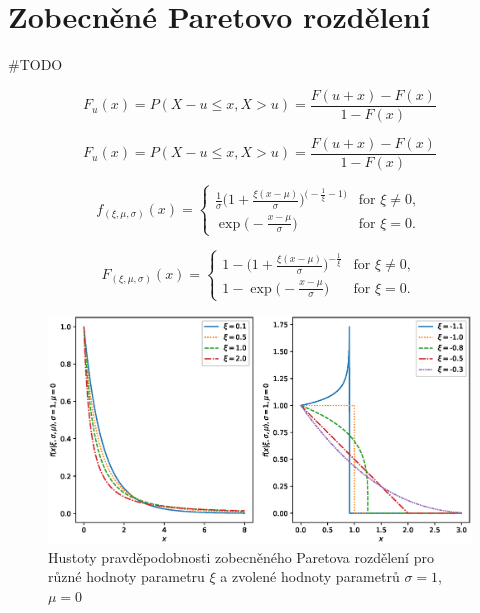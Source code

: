 \chapter{Zobecněné Paretovo rozdělení}\label{chap:gpd}
\#TODO

\begin{equation}
    F_u(x)=P(X-u \leq x,X>u)=\frac{F(u+x)-F(x)}{1-F(x)}
\end{equation}

\begin{equation}
    F_u(x)=P(X-u \leq x,X>u)=\frac{F(u+x)-F(x)}{1-F(x)}
\end{equation}


\begin{equation}
  f_{(\xi,\mu,\sigma)}(x)=\begin{cases}
    \frac{1}{\sigma}\Bigg(1+\frac{\xi(x-\mu)}{\sigma}\Bigg)^{\Big(-\frac{1}{\xi}-1\Big)} & \text{for $\xi \neq 0$},\\
    \exp \Big(-\frac{x-\mu}{\sigma}\Big) & \text{for $\xi = 0$}.
  \end{cases}
\end{equation}


\begin{equation}
  F_{(\xi,\mu,\sigma)}(x)=\begin{cases}
    1 - \Bigg(1+\frac{\xi(x-\mu)}{\sigma}\Bigg)^{-\frac{1}{\xi}} & \text{for $\xi \neq 0$},\\
    1 - \exp{\Big(-\frac{x-\mu}{\sigma} \Big)} & \text{for $\xi = 0$}.
  \end{cases}
\end{equation}

\begin{figure}
    \centering
    \includegraphics[scale=0.68]{IMG/MDPI/pdfs.eps}
    \caption{Hustoty pravděpodobnosti zobecněného Paretova rozdělení pro různé hodnoty parametru $\xi$ a zvolené hodnoty parametrů $\sigma=1$, $\mu=0$}
    \label{fig:gpd_pdfs}
\end{figure}






